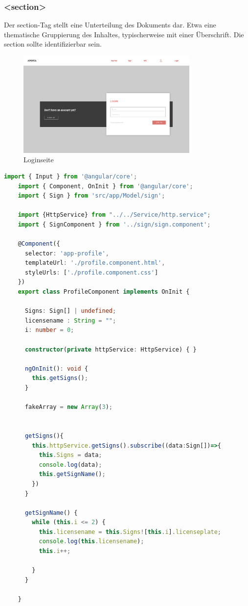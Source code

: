 \subsubsection{<section>}
Der section-Tag stellt eine Unterteilung des Dokuments dar. Etwa eine thematische Gruppierung des Inhaltes, typischerweise mit einer Überschrift. Die section sollte identifizierbar sein.
\cite{SectionTag}


\begin{figure}[h]
  \centering
  \includegraphics[width=0.8\textwidth]{pics/Loginseite.png}
  \caption{Loginseite}
\end{figure}
\pagebreak

\begin{lstlisting}[language=typeScript, caption=profile.component.ts]
    import { Input } from '@angular/core';
    import { Component, OnInit } from '@angular/core';
    import { Sign } from 'src/app/Model/sign';
    
    import {HttpService} from "../../Service/http.service";
    import { SignComponent } from '../sign/sign.component';
    
    @Component({
      selector: 'app-profile',
      templateUrl: './profile.component.html',
      styleUrls: ['./profile.component.css']
    })
    export class ProfileComponent implements OnInit {
    
      Signs: Sign[] | undefined;
      licensename : String = "";
      i: number = 0;
    
      constructor(private httpService: HttpService) { }
    
      ngOnInit(): void {
        this.getSigns();
      }
    
      fakeArray = new Array(3);
    
    
      getSigns(){
        this.httpService.getSigns().subscribe((data:Sign[])=>{
          this.Signs = data;
          console.log(data);
          this.getSignName();
        })
      }
    
      getSignName() {
        while (this.i <= 2) {
          this.licensename = this.Signs![this.i].licenseplate;
          console.log(this.licensename); 
          this.i++;
    
        }
      }
    
    }    
\end{lstlisting}

